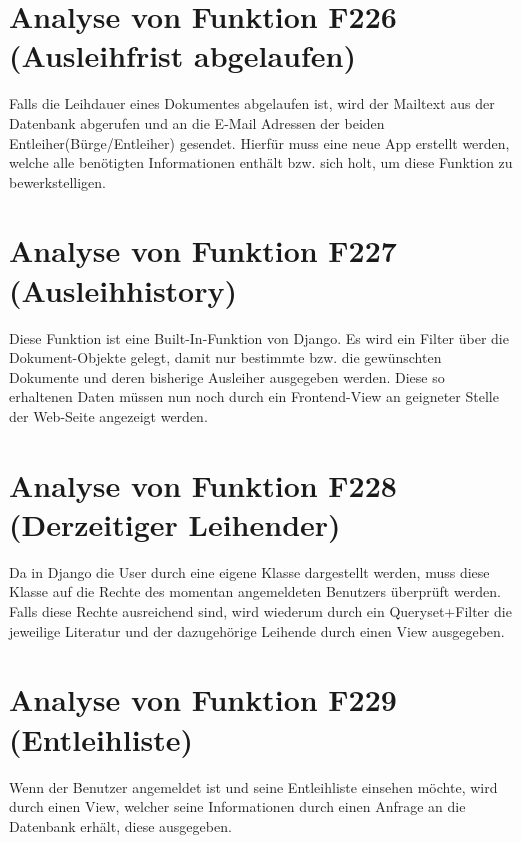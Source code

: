 \section{Analyse von Funktion F226 (Ausleihfrist abgelaufen)}
Falls die Leihdauer eines Dokumentes abgelaufen ist, wird der Mailtext aus der 
Datenbank abgerufen und an die E-Mail Adressen der beiden Entleiher(Bürge/Entleiher)
gesendet. Hierfür muss eine neue App erstellt werden, welche alle benötigten Informationen enthält bzw. sich holt, um diese Funktion zu bewerkstelligen.

\section{Analyse von Funktion F227 (Ausleihhistory)}
Diese Funktion ist eine Built-In-Funktion von Django.
Es wird ein Filter über die Dokument-Objekte gelegt, damit nur bestimmte bzw. die gewünschten Dokumente und deren bisherige Ausleiher ausgegeben werden. Diese so erhaltenen Daten müssen nun noch durch ein Frontend-View an geigneter Stelle der Web-Seite angezeigt werden.

\section{Analyse von Funktion F228 (Derzeitiger Leihender)}
Da in Django die User durch eine eigene Klasse dargestellt werden, muss diese Klasse auf die Rechte des momentan angemeldeten Benutzers überprüft werden. Falls diese Rechte ausreichend sind, wird wiederum durch ein Queryset+Filter die jeweilige Literatur und der dazugehörige Leihende durch einen View ausgegeben.


\section{Analyse von Funktion F229 (Entleihliste)}
Wenn der Benutzer angemeldet ist und seine Entleihliste einsehen möchte, wird 
durch einen View, welcher seine Informationen durch einen Anfrage an die Datenbank 
erhält, diese ausgegeben.

